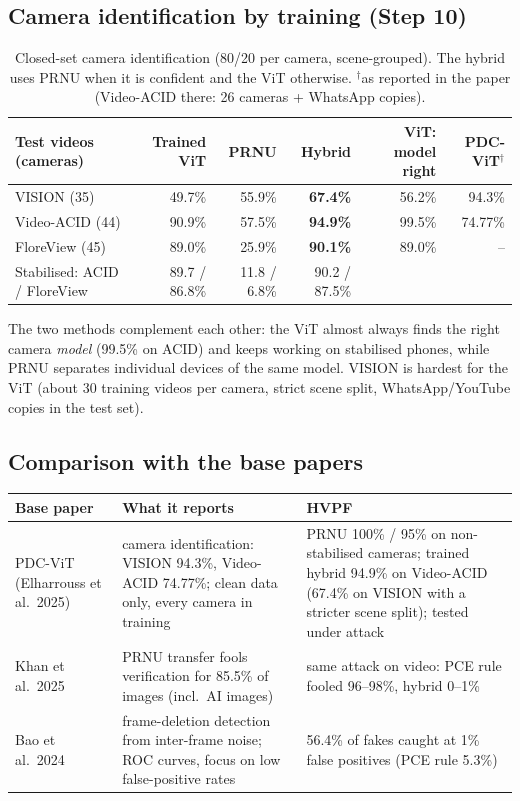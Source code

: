 \documentclass[11pt,a4paper]{article}
\begin{document}
\subsection{Camera identification by training (Step 10)}
\begin{table}[H]\centering\small
\setlength{\tabcolsep}{4.5pt}\begin{tabular}{lrrrrr}\toprule
Test videos (cameras) & Trained ViT & PRNU & \textbf{Hybrid} & ViT: model right & PDC-ViT$^\dagger$ \\\midrule
VISION (35) & 49.7\% & 55.9\% & \textbf{67.4\%} & 56.2\% & 94.3\% \\
Video-ACID (44) & 90.9\% & 57.5\% & \textbf{94.9\%} & 99.5\% & 74.77\% \\
FloreView (45) & 89.0\% & 25.9\% & \textbf{90.1\%} & 89.0\% & -- \\\midrule
Stabilised: ACID / FloreView & 89.7 / 86.8\% & 11.8 / 6.8\% & 90.2 / 87.5\% & & \\\bottomrule
\end{tabular}\caption{Closed-set camera identification (80/20 per camera, scene-grouped). The hybrid uses PRNU when it is
confident and the ViT otherwise. $^\dagger$as reported in the paper (Video-ACID there: 26 cameras + WhatsApp copies).}\label{tab:camid}\end{table}
The two methods complement each other: the ViT almost always finds the right camera \emph{model} (99.5\% on ACID) and keeps
working on stabilised phones, while PRNU separates individual devices of the same model. VISION is hardest for the ViT
(about 30 training videos per camera, strict scene split, WhatsApp/YouTube copies in the test set).

\subsection{Comparison with the base papers}
\begin{table}[H]\centering\small
\begin{tabularx}{\linewidth}{lYY}\toprule
Base paper & What it reports & HVPF \\\midrule
PDC-ViT (Elharrouss et al.\ 2025) & camera identification: VISION 94.3\%, Video-ACID 74.77\%; clean data only, every camera in
   training & PRNU 100\% / 95\% on non-stabilised cameras; trained hybrid 94.9\% on Video-ACID (67.4\% on VISION with a stricter
   scene split); tested under attack \\
Khan et al.\ 2025 & PRNU transfer fools verification for 85.5\% of images (incl.\ AI images) & same attack on video: PCE rule
   fooled 96--98\%, hybrid 0--1\% \\
Bao et al.\ 2024 & frame-deletion detection from inter-frame noise; ROC curves, focus on low false-positive rates &
   56.4\% of fakes caught at 1\% false positives (PCE rule 5.3\%) \\\bottomrule
\end{tabularx}\end{table}
\end{document}

